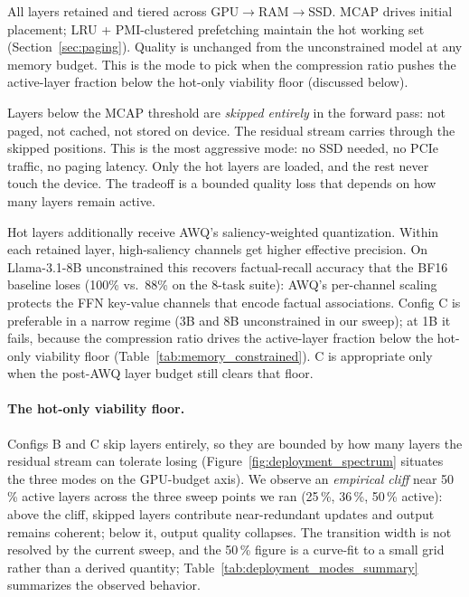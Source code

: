 \documentclass{article}
\begin{document}
\begin{description}[leftmargin=1.5em, itemsep=3pt]
\item[\textbf{Config A ,  Paged (baseline).}] All layers retained and tiered across
  GPU$\to$RAM$\to$SSD. MCAP drives initial placement; LRU + PMI-clustered prefetching
  maintain the hot working set (Section~\ref{sec:paging}). Quality is unchanged from the
  unconstrained model at any memory budget. This is the mode to pick when the
  compression ratio pushes the active-layer fraction below the hot-only viability floor
  (discussed below).

\item[\textbf{Config B ,  Hot-only.}] Layers below the MCAP threshold are
  \emph{skipped entirely} in the forward pass: not paged, not cached, not
  stored on device. The residual stream carries through the skipped positions.
  This is the most aggressive mode: no SSD needed, no PCIe traffic, no paging
  latency. Only the hot layers are loaded, and the rest never touch the device.
  The tradeoff is a bounded quality loss that depends on how many layers remain
  active.

\item[\textbf{Config C ,  Hot-only + AWQ.}] Hot layers additionally receive AWQ's
  saliency-weighted quantization. Within each retained layer, high-saliency channels get
  higher effective precision. On Llama-3.1-8B unconstrained this recovers factual-recall
  accuracy that the BF16 baseline loses (100\% vs.\ 88\% on the 8-task suite): AWQ's
  per-channel scaling protects the FFN key-value channels that encode factual
  associations. Config C is preferable in a narrow regime (3B and 8B
  unconstrained in our sweep); at 1B it fails, because the compression ratio
  drives the active-layer fraction below the hot-only viability floor
  (Table~\ref{tab:memory_constrained}). C is appropriate only when the post-AWQ
  layer budget still clears that floor.
\end{description}

\paragraph{The hot-only viability floor.} Configs B and C skip layers entirely, so they
are bounded by how many layers the residual stream can tolerate losing
(Figure~\ref{fig:deployment_spectrum} situates the three modes on the GPU-budget axis). We observe an
\emph{empirical cliff} near 50\,\% active layers across the three sweep points we ran
(25\,\%, 36\,\%, 50\,\% active): above the cliff, skipped layers contribute
near-redundant updates and output remains coherent; below it, output quality collapses.
The transition width is not resolved by the current sweep, and the 50\,\% figure is a
curve-fit to a small grid rather than a derived quantity;
Table~\ref{tab:deployment_modes_summary} summarizes the observed behavior.
\end{document}
